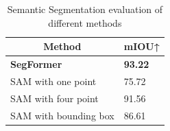 \begin{table}[t]
\centering
\begin{tabular}{ll}
\hline
\multicolumn{1}{c}{\textbf{Method}} & \multicolumn{1}{c}{\textbf{mIOU↑}} \\ \hline
\textbf{SegFormer}                             & \textbf{93.22}                                                        \\
SAM with one point                    & 75.72                                                        \\
SAM with four point                   & 91.56                                                        \\
SAM with bounding box                 & 86.61                                                        \\ \hline
\end{tabular}
\caption{Semantic Segmentation evaluation of different methods}
\label{table:segmentation-result}
\end{table}





